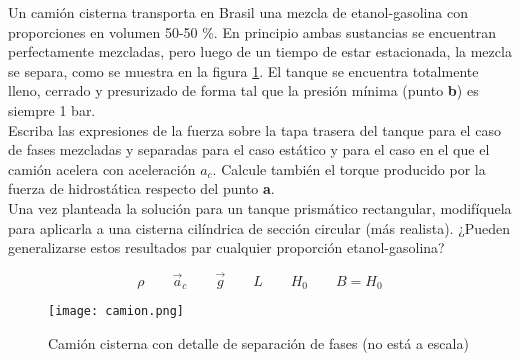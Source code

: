 \item Un camión cisterna transporta en Brasil una mezcla de etanol-gasolina
con proporciones en volumen 50-50 \%. En principio ambas sustancias se encuentran
perfectamente mezcladas, pero luego de un tiempo de estar estacionada, la mezcla
se separa, como se muestra en la figura \ref{fig:tanque}.
El tanque se encuentra totalmente lleno, cerrado y presurizado de forma tal que
la presión mínima (punto \textbf{b}) es siempre 1 bar.
\\
Escriba las expresiones de la fuerza sobre la tapa trasera del tanque
para el caso de fases mezcladas y separadas para el caso estático y para el caso
en el que el camión acelera con aceleración $a_c$. Calcule también el torque
producido por la fuerza de hidrostática respecto del punto \textbf{a}.
\\
Una vez planteada la solución para un tanque prismático rectangular, modifíquela
para aplicarla a una cisterna cilíndrica de sección circular (más realista).
¿Pueden generalizarse estos resultados par cualquier proporción etanol-gasolina?

\begin{equation*}
\rho \qquad \vec{a}_c \qquad \vec{g} \qquad L \qquad H_0 \qquad B = H_0
\end{equation*}


\begin{figure}[h]
  \centering
  \texttt{[image: camion.png]}
  \caption{Camión cisterna con detalle de separación de fases (no está a escala)}
  \label{fig:tanque}
\end{figure}



